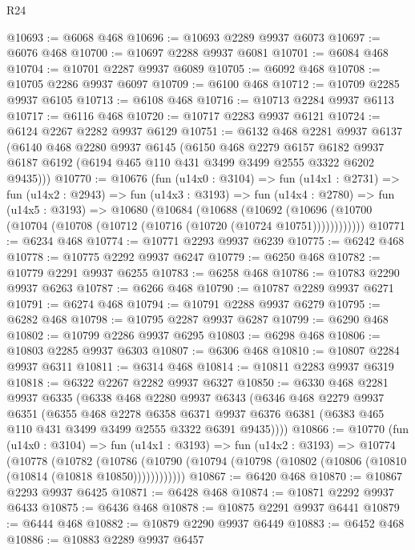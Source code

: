 \begin{lexlean}{R24}
\begin{coremodule}
@10693 := @6068 @468
@10696 := @10693 @2289 @9937 @6073
@10697 := @6076 @468
@10700 := @10697 @2288 @9937 @6081
@10701 := @6084 @468
@10704 := @10701 @2287 @9937 @6089
@10705 := @6092 @468
@10708 := @10705 @2286 @9937 @6097
@10709 := @6100 @468
@10712 := @10709 @2285 @9937 @6105
@10713 := @6108 @468
@10716 := @10713 @2284 @9937 @6113
@10717 := @6116 @468
@10720 := @10717 @2283 @9937 @6121
@10724 := @6124 @2267 @2282 @9937 @6129
@10751 := @6132
    @468
    @2281
    @9937
    @6137
    (@6140
      @468
      @2280
      @9937
      @6145
      (@6150
        @468
        @2279
        @6157
        @6182
        @9937
        @6187
        @6192
        (@6194 @465 @110 @431 @3499 @3499 @2555 @3322 @6202 @9435)))
@10770 := @10676
    (fun (u14x0 : @3104) =>
    fun (u14x1 : @2731) =>
    fun (u14x2 : @2943) =>
    fun (u14x3 : @3193) =>
    fun (u14x4 : @2780) =>
    fun (u14x5 : @3193) =>
    @10680
      (@10684
        (@10688
          (@10692 (@10696 (@10700 (@10704 (@10708 (@10712 (@10716 (@10720 (@10724 @10751))))))))))))
@10771 := @6234 @468
@10774 := @10771 @2293 @9937 @6239
@10775 := @6242 @468
@10778 := @10775 @2292 @9937 @6247
@10779 := @6250 @468
@10782 := @10779 @2291 @9937 @6255
@10783 := @6258 @468
@10786 := @10783 @2290 @9937 @6263
@10787 := @6266 @468
@10790 := @10787 @2289 @9937 @6271
@10791 := @6274 @468
@10794 := @10791 @2288 @9937 @6279
@10795 := @6282 @468
@10798 := @10795 @2287 @9937 @6287
@10799 := @6290 @468
@10802 := @10799 @2286 @9937 @6295
@10803 := @6298 @468
@10806 := @10803 @2285 @9937 @6303
@10807 := @6306 @468
@10810 := @10807 @2284 @9937 @6311
@10811 := @6314 @468
@10814 := @10811 @2283 @9937 @6319
@10818 := @6322 @2267 @2282 @9937 @6327
@10850 := @6330
    @468
    @2281
    @9937
    @6335
    (@6338
      @468
      @2280
      @9937
      @6343
      (@6346
        @468
        @2279
        @9937
        @6351
        (@6355
          @468
          @2278
          @6358
          @6371
          @9937
          @6376
          @6381
          (@6383 @465 @110 @431 @3499 @3499 @2555 @3322 @6391 @9435))))
@10866 := @10770
    (fun (u14x0 : @3104) =>
    fun (u14x1 : @3193) =>
    fun (u14x2 : @3193) =>
    @10774
      (@10778
        (@10782
          (@10786 (@10790 (@10794 (@10798 (@10802 (@10806 (@10810 (@10814 (@10818 @10850))))))))))))
@10867 := @6420 @468
@10870 := @10867 @2293 @9937 @6425
@10871 := @6428 @468
@10874 := @10871 @2292 @9937 @6433
@10875 := @6436 @468
@10878 := @10875 @2291 @9937 @6441
@10879 := @6444 @468
@10882 := @10879 @2290 @9937 @6449
@10883 := @6452 @468
@10886 := @10883 @2289 @9937 @6457

\end{coremodule}
\end{lexlean}
